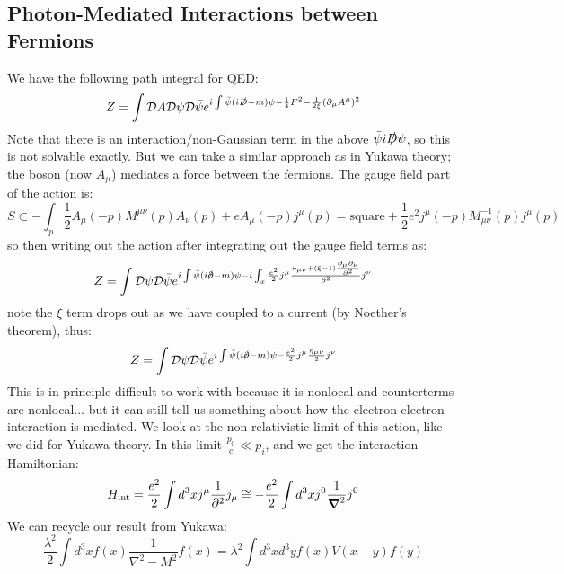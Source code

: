 \subsection{Photon-Mediated Interactions between Fermions}
We have the following path integral for QED:
\begin{equation}
    Z = \int \mathcal{D}A\mathcal{D}\psi\mathcal{D}\bar{\psi} e^{i\int \bar{\psi}(i\slashed{D} - m)\psi - \frac{1}{4}F^2 - \frac{1}{2\xi}(\partial_\mu A^\mu)^2}
\end{equation}
Note that there is an interaction/non-Gaussian term in the above $\bar{\psi}i\slashed{D}\psi$, so this is not solvable exactly. But we can take a similar approach as in Yukawa theory; the boson (now $A_\mu$) mediates a force between the fermions. The gauge field part of the action is:
\begin{equation}
    S \subset -\int_p \frac{1}{2}A_\mu(-p)M^{\mu\nu}(p)A_\nu(p) + eA_\mu(-p)j^\mu(p) = \text{square} + \frac{1}{2}e^2j^\mu(-p)M^{-1}_{\mu\nu}(p)j^\mu(p)
\end{equation}
so then writing out the action after integrating out the gauge field terms as:
\begin{equation}
    Z = \int \mathcal{D}\psi \mathcal{D}\bar{\psi} e^{i\int \bar{\psi}(i\slashed{\p} - m)\psi - i\int_x \frac{e^2}{2}j^\mu \frac{\eta_{\mu\nu} + (\xi - 1)\frac{\p_\mu \p_\nu}{\p^2}}{\p^2}j^\nu}
\end{equation}
note the $\xi$ term drops out as we have coupled to a current (by Noether's theorem), thus:
\begin{equation}
    Z = \int \mathcal{D}\psi \mathcal{D}\bar{\psi}e^{i\int \bar{\psi}(i\slashed{\p} - m)\psi - \frac{e^2}{2}j^\mu \frac{\eta_{\mu\nu}}{2}j^\nu}
\end{equation}
This is in principle difficult to work with because it is nonlocal and counterterms are nonlocal... but it can still tell us something about how the electron-electron interaction is mediated. We look at the non-relativistic limit of this action, like we did for Yukawa theory. In this limit $\frac{p_0}{c} \ll p_i$, and we get the interaction Hamiltonian:
\begin{equation}
    H_{\text{int}} = \frac{e^2}{2}\int d^3x j^\mu\frac{1}{\p^2}j_\mu \cong -\frac{e^2}{2}\int d^3x j^0 \frac{1}{\nabla^2}j^0
\end{equation}
We can recycle our result from Yukawa:
\begin{equation}
    \frac{\lambda^2}{2}\int d^3x f(x)\frac{1}{\nabla^2 - M^2}f(x) = \lambda^2\int d^3x d^3yf(x)V(x - y)f(y)
\end{equation}
